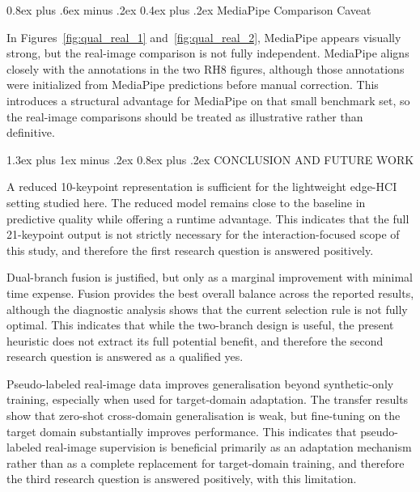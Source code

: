 ﻿\documentclass[10pt,letterpaper]{article}
\makeatletter
\renewcommand\section{\@startsection{section}{1}{\z@}%
  {1.3ex plus 1ex minus .2ex}%
  {0.8ex plus .2ex}%
  {\centering\normalfont\small\scshape}}
\renewcommand\subsubsection{\@startsection{subsubsection}{3}{\z@}%
  {0.8ex plus .6ex minus .2ex}%
  {0.4ex plus .2ex}%
  {\normalfont\small\itshape}}
\makeatother
\begin{document}
\subsubsection{MediaPipe Comparison Caveat}

\medskip
\noindent
In Figures~\ref{fig:qual_real_1} and~\ref{fig:qual_real_2}, MediaPipe appears visually strong, but the real-image comparison is not fully independent. MediaPipe aligns closely with the annotations in the two RH8 figures, although those annotations were initialized from MediaPipe predictions before manual correction. This introduces a structural advantage for MediaPipe on that small benchmark set, so the real-image comparisons should be treated as illustrative rather than definitive.

\section{CONCLUSION AND FUTURE WORK}

\noindent
A reduced 10-keypoint representation is sufficient for the lightweight edge-HCI setting studied here. The reduced model remains close to the baseline in predictive quality while offering a runtime advantage. This indicates that the full 21-keypoint output is not strictly necessary for the interaction-focused scope of this study, and therefore the first research question is answered positively.

\medskip
\noindent
Dual-branch fusion is justified, but only as a marginal improvement with minimal time expense. Fusion provides the best overall balance across the reported results, although the diagnostic analysis shows that the current selection rule is not fully optimal. This indicates that while the two-branch design is useful, the present heuristic does not extract its full potential benefit, and therefore the second research question is answered as a qualified yes.

\medskip
\noindent
Pseudo-labeled real-image data improves generalisation beyond synthetic-only training, especially when used for target-domain adaptation. The transfer results show that zero-shot cross-domain generalisation is weak, but fine-tuning on the target domain substantially improves performance. This indicates that pseudo-labeled real-image supervision is beneficial primarily as an adaptation mechanism rather than as a complete replacement for target-domain training, and therefore the third research question is answered positively, with this limitation.
\end{document}
